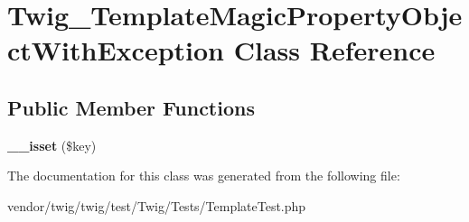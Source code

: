 \hypertarget{classTwig__TemplateMagicPropertyObjectWithException}{}\section{Twig\+\_\+\+Template\+Magic\+Property\+Object\+With\+Exception Class Reference}
\label{classTwig__TemplateMagicPropertyObjectWithException}
\subsection*{Public Member Functions}
\begin{DoxyCompactItemize}
\item 
{\bfseries \+\_\+\+\_\+isset} (\$key)\hypertarget{classTwig__TemplateMagicPropertyObjectWithException_ab2a3a06d6e1702fffe3937836b39804d}{}\label{classTwig__TemplateMagicPropertyObjectWithException_ab2a3a06d6e1702fffe3937836b39804d}

\end{DoxyCompactItemize}


The documentation for this class was generated from the following file\+:\begin{DoxyCompactItemize}
\item 
vendor/twig/twig/test/\+Twig/\+Tests/Template\+Test.\+php\end{DoxyCompactItemize}
